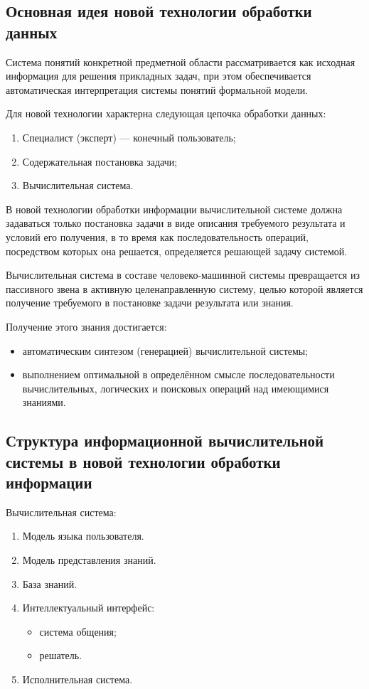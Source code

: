 \documentclass[a4paper,12pt]{report}
\begin{document}
\subsection{Основная идея новой технологии обработки данных}

	Система понятий конкретной предметной области рассматривается как исходная
	информация для решения прикладных задач, при этом обеспечивается
	автоматическая интерпретация системы понятий формальной модели.\par
	Для новой технологии характерна следующая цепочка обработки данных:
	\begin{enumerate}
		\item Специалист (эксперт) — конечный пользователь;
		\item Содержательная постановка задачи;
		\item Вычислительная система.
	\end{enumerate}
	В новой технологии обработки информации вычислительной системе должна
	задаваться только постановка задачи в виде описания требуемого результата и
	условий его получения, в то время как последовательность операций,
	посредством которых она решается, определяется решающей задачу системой.\par
	Вычислительная система в составе человеко-машинной системы превращается из
	пассивного звена в активную целенаправленную систему, целью которой является
	получение требуемого в постановке задачи результата или знания.\par
	Получение этого знания достигается:
	\begin{itemize}
		\item автоматическим синтезом (генерацией) вычислительной системы;
		\item выполнением оптимальной в определённом смысле последовательности
			вычислительных, логических и поисковых операций над имеющимися знаниями.
	\end{itemize}


\subsection{Структура информационной вычислительной системы в новой
	технологии обработки информации}

	Вычислительная система:
	\begin{enumerate}
		\item Модель языка пользователя.
		\item Модель представления знаний.
		\item База знаний.
		\item Интеллектуальный интерфейс:
			\begin{itemize}
				\item система общения;
				\item решатель.
			\end{itemize}
		\item Исполнительная система.
	\end{enumerate}
\end{document}
